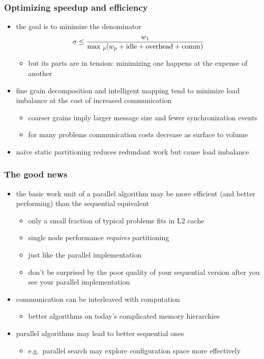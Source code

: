 \begin{frame}[fragile]
%
  \frametitle{Optimizing speedup and efficiency}
  \begin{itemize}
%
    \item the goal is to minimize the denominator
      \[
      \sigma \leq \frac{w_{1}}{{\rm max\ }_{p}(w_{p} + {\rm idle} + {\rm overhead} + {\rm comm})}
      \]
      \begin{itemize}
        \item but its parts are in tension: minimizing one happens at the expense of another
      \end{itemize}
%
  \item fine grain decomposition and intelligent mapping tend to minimize load imbalance at the
    cost of increased communication
    \begin{itemize}
    \item coarser grains imply larger message size and fewer synchronization events
    \item for many problems communication costs decrease as surface to volume
    \end{itemize}
%
  \item na\"ive static partitioning reduces redundant work but cause load imbalance
%
  \end{itemize}
%
\end{frame}

\begin{frame}[fragile]
%
  \frametitle{The good news}
%
  \begin{itemize}
%
  \item the basic work unit of a parallel algorithm may be more efficient (and better
    performing) than the sequential equivalent
    \begin{itemize}
    \item only a small fraction of typical problems fits in L2 cache
    \item single node performance {\em requires} partitioning
    \item just like the parallel implementation
    \item don't be surprised by the poor quality of your sequential version after you see
      your parallel implementation
    \end{itemize}
%
  \item communication can be interleaved with computation
    \begin{itemize}
    \item better algorithms on today's complicated memory hierarchies
    \end{itemize}
%
    \item parallel algorithms may lead to better sequential ones
      \begin{itemize}
        \item e.g.~parallel search may explore configuration space more effectively
      \end{itemize}
%
  \end{itemize}
%
\end{frame}

